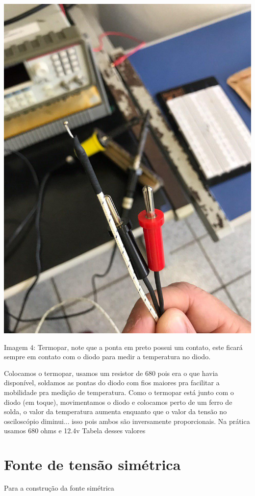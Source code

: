 \documentclass{article}
\begin{document}
\begin{center}
    \includegraphics[scale=0.2]{images/termopar.jpg}
    
    Imagem 4: Termopar, note que a ponta em preto possui um contato, este ficará sempre em contato com o diodo para medir a temperatura no diodo.
\end{center}

Colocamos o termopar, usamos um resistor de 680 pois era o que havia disponível, soldamos as pontas do diodo com fios maiores pra facilitar a mobilidade pra medição de temperatura. Como o termopar está junto com o diodo (em toque), movimentamos o diodo e colocamos perto de um ferro de solda, o valor da temperatura aumenta enquanto que o valor da tensão no osciloscópio diminui... isso pois ambos são inversamente proporcionais.
Na prática usamos 680 ohms e 12.4v
Tabela desses valores


\section{Fonte de tensão simétrica}
Para a construção da fonte simétrica
\end{document}
